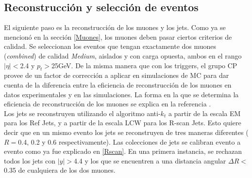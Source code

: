 \subsection{Reconstrucción y selección de eventos}

El siguiente paso es la reconstrucción de los muones y los jets. Como ya se mencionó en la sección \ref{Muones}, los muones deben pasar ciertos criterios de calidad. Se seleccionan los eventos que tengan exactamente dos muones (\textit{combined}) de calidad \textit{Medium}\cite{SelTool}, aislados\cite{IsoTool} y con carga opuesta, ambos en el rango $|\eta|<$2.4 y $p_t>$25GeV. De la misma manera que con los triggers, el grupo CP provee de un factor de corrección \cite{MCPGuidelines} a aplicar en simulaciones de MC para dar cuenta de la diferencia entre la 
eficiencia de reconstrucción de los muones en datos experimentales y en las simulaciones. La forma en la que se determina la eficiencia de reconstrucción de los muones se explica en la referencia \cite{MuonReco}. 
\\

Los jets se reconstruyen utilizando el algoritmo anti-$k_t$ a partir de la escala EM para los Ref Jets, y a partir de la escala LCW para los R-scan Jets. Esto quiere decir que en un mismo evento los jets se reconstruyen de tres maneras diferentes ($R=$0.4, 0.2 y 0.6 respectivamente). Las colecciones de jets se calibran evento a evento como ya fue explicado en \ref{Rscan}. En una primera instancia, se rechazan todos los jets con $|y|>$4.4 y los que se encuentren a una distancia angular $\Delta R<$0.35 de cualquiera de los dos muones. 


